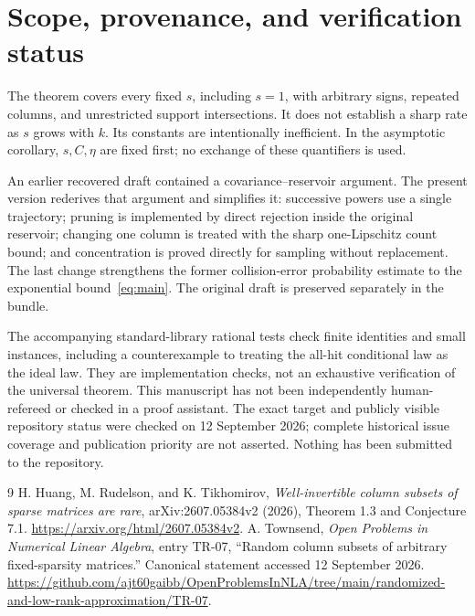 \documentclass[11pt,a4paper]{article}
\theoremstyle{remark}\newtheorem{remark}[theorem]{Remark}
\begin{document}
\section*{Scope, provenance, and verification status}
The theorem covers every fixed $s$, including $s=1$, with arbitrary signs, repeated columns, and unrestricted support intersections. It does not establish a sharp rate as $s$ grows with $k$. Its constants are intentionally inefficient. In the asymptotic corollary, $s,C,\eta$ are fixed first; no exchange of these quantifiers is used.

An earlier recovered draft contained a covariance--reservoir argument. The present version rederives that argument and simplifies it: successive powers use a single trajectory; pruning is implemented by direct rejection inside the original reservoir; changing one column is treated with the sharp one-Lipschitz count bound; and concentration is proved directly for sampling without replacement. The last change strengthens the former collision-error probability estimate to the exponential bound~\eqref{eq:main}. The original draft is preserved separately in the bundle.

The accompanying standard-library rational tests check finite identities and small instances, including a counterexample to treating the all-hit conditional law as the ideal law. They are implementation checks, not an exhaustive verification of the universal theorem. This manuscript has not been independently human-refereed or checked in a proof assistant. The exact target and publicly visible repository status were checked on 12 September 2026; complete historical issue coverage and publication priority are not asserted. Nothing has been submitted to the repository.

\begin{thebibliography}{9}
H. Huang, M. Rudelson, and K. Tikhomirov,
\emph{Well-invertible column subsets of sparse matrices are rare},
arXiv:2607.05384v2 (2026), Theorem 1.3 and Conjecture 7.1.
\url{https://arxiv.org/html/2607.05384v2}.
A. Townsend, \emph{Open Problems in Numerical Linear Algebra}, entry TR-07,
``Random column subsets of arbitrary fixed-sparsity matrices.''
Canonical statement accessed 12 September 2026.
\url{https://github.com/ajt60gaibb/OpenProblemsInNLA/tree/main/randomized-and-low-rank-approximation/TR-07}.
\end{thebibliography}
\end{document}
